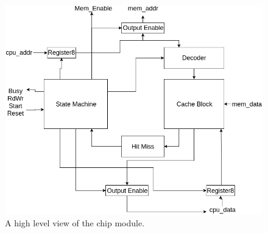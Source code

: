 \documentclass[10pt]{article}
\begin{document}
\begin{figure}
    \centering
    \includegraphics[width=\textwidth]{chd.png}
    \caption{A high level view of the chip module.}
    \label{chiphd}
\end{figure}


\newpage
\newpage
\end{document}
